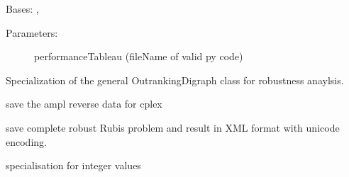 \documentclass[letterpaper,10pt,english]{sphinxmanual}
\begin{document}
\begin{fulllineitems}
\label{techDoc:outrankingDigraphs.RobustOutrankingDigraph}
Bases: {\hyperref[techDoc:outrankingDigraphs.BipolarOutrankingDigraph]{}}, {\hyperref[techDoc:perfTabs.PerformanceTableau]{}}
\begin{description}
\item[{Parameters:}] \leavevmode
performanceTableau (fileName of valid py code)

\end{description}

Specialization of the general OutrankingDigraph class for 
robustness anaylsis.

\begin{fulllineitems}
\label{techDoc:outrankingDigraphs.RobustOutrankingDigraph.saveAMPLDataFile}
save the ampl reverse data for cplex

\end{fulllineitems}


\begin{fulllineitems}
\label{techDoc:outrankingDigraphs.RobustOutrankingDigraph.saveXMLRubisOutrankingDigraph}
save complete robust Rubis problem and result in XML format with unicode encoding.

\end{fulllineitems}


\begin{fulllineitems}
\label{techDoc:outrankingDigraphs.RobustOutrankingDigraph.showRelationTable}
specialisation for integer values

\end{fulllineitems}


\end{fulllineitems}
\end{document}
